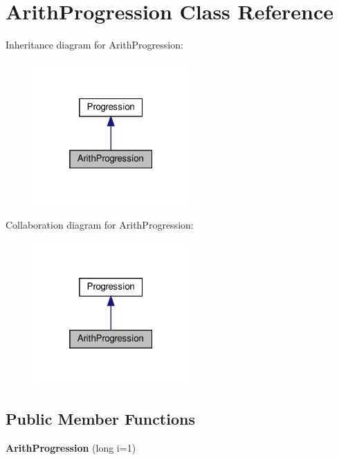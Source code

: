\hypertarget{classArithProgression}{}\section{Arith\+Progression Class Reference}
\label{classArithProgression}


Inheritance diagram for Arith\+Progression\+:
\nopagebreak
\begin{figure}[H]
\begin{center}
\leavevmode
\includegraphics[width=169pt]{classArithProgression__inherit__graph}
\end{center}
\end{figure}


Collaboration diagram for Arith\+Progression\+:
\nopagebreak
\begin{figure}[H]
\begin{center}
\leavevmode
\includegraphics[width=169pt]{classArithProgression__coll__graph}
\end{center}
\end{figure}
\subsection*{Public Member Functions}
\begin{DoxyCompactItemize}
\item 
\mbox{\label{classArithProgression_a6c3f2d78b0c158f05662b2ad7d48dec5}} 
{\bfseries Arith\+Progression} (long i=1)
\end{DoxyCompactItemize}

